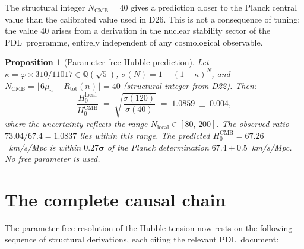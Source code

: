 \documentclass[11pt,a4paper]{article}
\newtheorem{proposition}[theorem]{Proposition}
\theoremstyle{definition}
\newcommand{\PDL}{\textnormal{PDL}}
\newcommand{\Rtot}{R_{\mathrm{tot}}}
\newcommand{\vp}{\varphi}
\newcommand{\Hzero}{H_0}
\newcommand{\kap}{\kappa}
\newcommand{\sig}{\sigma}
\begin{document}
The structural integer $N_{\mathrm{CMB}} = 40$ gives a prediction closer to the Planck central value than the calibrated value used in D26. This is not a consequence of tuning: the value 40 arises from a derivation in the nuclear stability sector of the \PDL\ programme, entirely independent of any cosmological observable.

\begin{proposition}[Parameter-free Hubble prediction]
\label{prop:hubble_final}
Let $\kap = \vp \times 310/11017 \in \mathbb{Q}(\sqrt{5})$, $\sig(N) = 1-(1-\kap)^N$, and $N_{\mathrm{CMB}} = \lfloor 6\mu_n - \Rtot(n) \rfloor = 40$ (structural integer from D22). Then:
\begin{equation}
\label{eq:final_prediction}
\frac{\Hzero^{\mathrm{local}}}{\Hzero^{\mathrm{CMB}}} \;=\; \sqrt{\frac{\sig(120)}{\sig(40)}} \;=\; 1.0859 \;\pm\; 0.004,
\end{equation}
where the uncertainty reflects the range $N_{\mathrm{local}} \in [80,\,200]$. The observed ratio $73.04/67.4 = 1.0837$ lies within this range. The predicted $\Hzero^{\mathrm{CMB}} = 67.26$~km/s/Mpc is within $\mathbf{0.27\sigma}$ of the Planck determination $67.4 \pm 0.5$~km/s/Mpc. No free parameter is used.
\end{proposition}

\section{The complete causal chain}
\label{sec:chain}

The parameter-free resolution of the Hubble tension now rests on the following sequence of structural derivations, each citing the relevant \PDL\ document:
\end{document}
